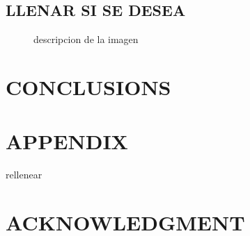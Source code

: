 \documentclass[journal]{IEEEtran}
\begin{document}
\subsection{LLENAR SI SE DESEA}



   \begin{figure}[thpb]
      \centering
      \caption{descripcion de la imagen }
      \label{figurelabel}
   \end{figure}
   


\section{CONCLUSIONS}



\addtolength{\textheight}{-12cm}




\section*{APPENDIX}

rellenear

\section*{ACKNOWLEDGMENT}

\begin{thebibliography}{99}



\end{thebibliography}
\end{document}

